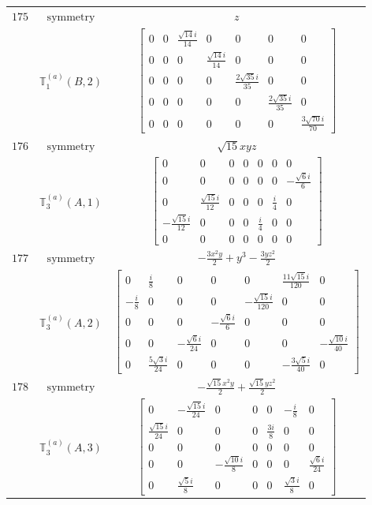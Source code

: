 \documentclass[fleqn,8pt,landscape]{jsarticle}
\begin{document}
\begin{longtable}{ccc}
$ 175 $ & $ \text{symmetry} $ & $ z $ \\
$  $ & $ \mathbb{T}_{1}^{(a)}(B,2) $ & $ \begin{bmatrix} 0 & 0 & \frac{\sqrt{14} i}{14} & 0 & 0 & 0 & 0 \\ 0 & 0 & 0 & \frac{\sqrt{14} i}{14} & 0 & 0 & 0 \\ 0 & 0 & 0 & 0 & \frac{2 \sqrt{35} i}{35} & 0 & 0 \\ 0 & 0 & 0 & 0 & 0 & \frac{2 \sqrt{35} i}{35} & 0 \\ 0 & 0 & 0 & 0 & 0 & 0 & \frac{3 \sqrt{70} i}{70} \end{bmatrix} $ \\ \hline
$ 176 $ & $ \text{symmetry} $ & $ \sqrt{15} x y z $ \\
$  $ & $ \mathbb{T}_{3}^{(a)}(A,1) $ & $ \begin{bmatrix} 0 & 0 & 0 & 0 & 0 & 0 & 0 \\ 0 & 0 & 0 & 0 & 0 & 0 & - \frac{\sqrt{6} i}{6} \\ 0 & \frac{\sqrt{15} i}{12} & 0 & 0 & 0 & \frac{i}{4} & 0 \\ - \frac{\sqrt{15} i}{12} & 0 & 0 & 0 & \frac{i}{4} & 0 & 0 \\ 0 & 0 & 0 & 0 & 0 & 0 & 0 \end{bmatrix} $ \\ \hline
$ 177 $ & $ \text{symmetry} $ & $ - \frac{3 x^{2} y}{2} + y^{3} - \frac{3 y z^{2}}{2} $ \\
$  $ & $ \mathbb{T}_{3}^{(a)}(A,2) $ & $ \begin{bmatrix} 0 & \frac{i}{8} & 0 & 0 & 0 & \frac{11 \sqrt{15} i}{120} & 0 \\ - \frac{i}{8} & 0 & 0 & 0 & - \frac{\sqrt{15} i}{120} & 0 & 0 \\ 0 & 0 & 0 & - \frac{\sqrt{6} i}{6} & 0 & 0 & 0 \\ 0 & 0 & - \frac{\sqrt{6} i}{24} & 0 & 0 & 0 & - \frac{\sqrt{10} i}{40} \\ 0 & \frac{5 \sqrt{3} i}{24} & 0 & 0 & 0 & - \frac{3 \sqrt{5} i}{40} & 0 \end{bmatrix} $ \\ \hline
$ 178 $ & $ \text{symmetry} $ & $ - \frac{\sqrt{15} x^{2} y}{2} + \frac{\sqrt{15} y z^{2}}{2} $ \\
$  $ & $ \mathbb{T}_{3}^{(a)}(A,3) $ & $ \begin{bmatrix} 0 & - \frac{\sqrt{15} i}{24} & 0 & 0 & 0 & - \frac{i}{8} & 0 \\ \frac{\sqrt{15} i}{24} & 0 & 0 & 0 & \frac{3 i}{8} & 0 & 0 \\ 0 & 0 & 0 & 0 & 0 & 0 & 0 \\ 0 & 0 & - \frac{\sqrt{10} i}{8} & 0 & 0 & 0 & \frac{\sqrt{6} i}{24} \\ 0 & \frac{\sqrt{5} i}{8} & 0 & 0 & 0 & \frac{\sqrt{3} i}{8} & 0 \end{bmatrix} $ \\ \hline

\end{longtable}
\end{document}

